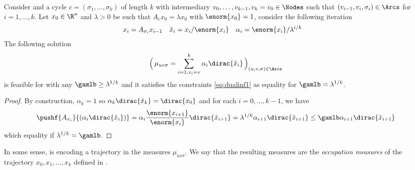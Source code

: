 \begin{lemma}
    \label{lem:traj2meas}
    Consider 
    and a cycle $c = (\sigma_1, \ldots, \sigma_k)$ of length $k$ with intermediary \nodes{} $v_0, \ldots, v_{k-1},v_k=v_0 \in \Nodes$ such that $(v_{i-1}, v_i, \sigma_i) \in \Arcs$ for $i = 1, \ldots, k$.
    Let $x_0 \in \R^n$ and $\lambda > 0$ be such that $A_c x_0 = \lambda x_0$ with $\enorm{x_0} = 1$,
    consider the following iteration
    \begin{align*}
      x_i & = A_{\sigma_i} x_{i-1} &
      \hat{x}_i & = x_i/\enorm{x_i} &
      \alpha_i & = \enorm{x_i}/\lambda^{i/k}
    \end{align*}
    The following solution
    \[ \Big(\,\mu_{uv\sigma} = \sum_{i=1,v_i = v}^k \alpha_i \dirac{\hat{x}_i} \,\Big)_{(u,v,\sigma) \in \Arcs} \]
    is feasible for  with any $\gamlb \geq \lambda^{1/k}$
    and it satisfies the constraints \eqref{eq:dualinf1} as equality for $\gamlb = \lambda^{1/k}$.
    \begin{proof}
        By construction, $\alpha_k = 1$ so $\alpha_k\dirac{\hat{x}_k} = \dirac{x_0}$ and
        for each $i = 0, \ldots, k-1$, we have
        \[
            \pushf{A_{\sigma_i}}{(\alpha_i \dirac{\hat{x}_i})}
            = \alpha_i \frac{\enorm{x_{i+1}}}{\enorm{x_i}} \dirac{\hat{x}_{i+1}}
            = \lambda^{1/k} \alpha_{i+1} \dirac{\hat{x}_{i+1}}
            \leq \gamlb \alpha_{i+1} \dirac{\hat{x}_{i+1}}
        \]
        which equality if $\lambda^{1/k} = \gamlb$.
    \end{proof}
\end{lemma}


In some sense,  is encoding a trajectory in the measures $\mu_{uv\sigma}$.
We say that the resulting measures are the \emph{occupation measures} of the trajectory $x_0, x_1, \ldots, x_k$ defined in .



